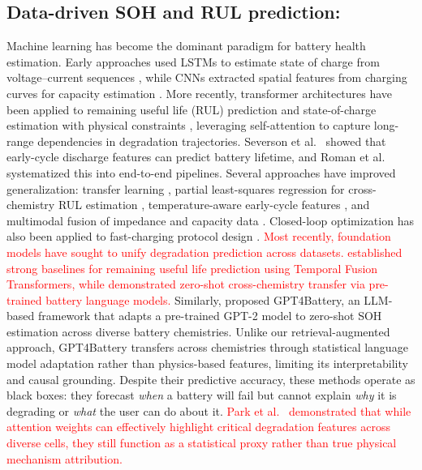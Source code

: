 \documentclass[5p,times,authoryear]{elsarticle}
\begin{document}
\subsection{Data-driven SOH and RUL prediction:}
Machine learning has become the dominant paradigm for battery health estimation. Early approaches used LSTMs to estimate state of charge from voltage--current sequences \citep{chemali2017long}, while CNNs extracted spatial features from charging curves for capacity estimation \citep{shen2019deep}. More recently, transformer architectures have been applied to remaining useful life (RUL) prediction \citep{chen2022transformer, park2025transformer} and state-of-charge estimation with physical constraints \citep{pitm2025}, leveraging self-attention to capture long-range dependencies in degradation trajectories. Severson et al.\ \citep{severson2019nature} showed that early-cycle discharge features can predict battery lifetime, and Roman et al.\ \citep{roman2021machine} systematized this into end-to-end pipelines. Several approaches have improved generalization: transfer learning \citep{liu2023transfer, che2022battery, zhu2022transfer}, partial least-squares regression for cross-chemistry RUL estimation \citep{wang2024generalizable}, temperature-aware early-cycle features \citep{sugiarto2025temperature}, and multimodal fusion of impedance and capacity data \citep{chen2026multimodal, hu2023eis}. Closed-loop optimization has also been applied to fast-charging protocol design \citep{attia2020closedloop}. \textcolor{red}{Most recently, foundation models have sought to unify degradation prediction across datasets. \citet{ma2024battery} established strong baselines for remaining useful life prediction using Temporal Fusion Transformers, while \citet{ren2024pretrained} demonstrated zero-shot cross-chemistry transfer via pre-trained battery language models.} Similarly, \citet{zhao2024gpt4battery} proposed GPT4Battery, an LLM-based framework that adapts a pre-trained GPT-2 model to zero-shot SOH estimation across diverse battery chemistries. Unlike our retrieval-augmented approach, GPT4Battery transfers across chemistries through statistical language model adaptation rather than physics-based features, limiting its interpretability and causal grounding. Despite their predictive accuracy, these methods operate as black boxes: they forecast \textit{when} a battery will fail but cannot explain \textit{why} it is degrading or \textit{what} the user can do about it. \textcolor{red}{Park et al.\ \citep{park2025transformer} demonstrated that while attention weights can effectively highlight critical degradation features across diverse cells, they still function as a statistical proxy rather than true physical mechanism attribution.}
\end{document}
